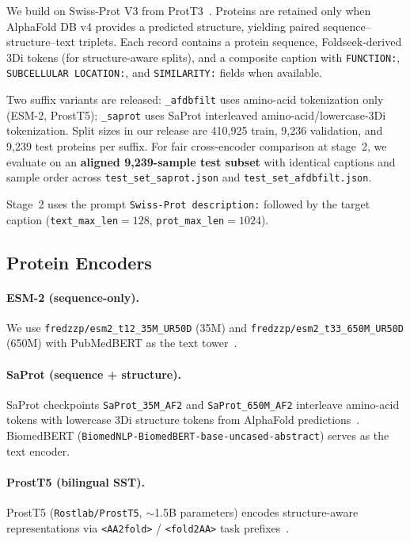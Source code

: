 \documentclass[conference]{IEEEtran}
\begin{document}
We build on Swiss-Prot V3 from ProtT3~\cite{liu2024prott3}.
Proteins are retained only when AlphaFold DB v4 provides a predicted structure, yielding paired sequence--structure--text triplets.
Each record contains a protein sequence, Foldseek-derived 3Di tokens (for structure-aware splits), and a composite caption with \texttt{FUNCTION:}, \texttt{SUBCELLULAR LOCATION:}, and \texttt{SIMILARITY:} fields when available.

Two suffix variants are released:
\texttt{\_afdbfilt} uses amino-acid tokenization only (ESM-2, ProstT5);
\texttt{\_saprot} uses SaProt interleaved amino-acid/lowercase-3Di tokenization.
Split sizes in our release are 410{,}925 train, 9{,}236 validation, and 9{,}239 test proteins per suffix.
For fair cross-encoder comparison at stage~2, we evaluate on an \textbf{aligned 9{,}239-sample test subset} with identical captions and sample order across \texttt{test\_set\_saprot.json} and \texttt{test\_set\_afdbfilt.json}.

Stage~2 uses the prompt \texttt{Swiss-Prot description:} followed by the target caption (\texttt{text\_max\_len}${=}128$, \texttt{prot\_max\_len}${=}1024$).

\subsection{Protein Encoders}

\paragraph{ESM-2 (sequence-only).}
We use \texttt{fredzzp/esm2\_t12\_35M\_UR50D} (35M) and \texttt{fredzzp/esm2\_t33\_650M\_UR50D} (650M) with PubMedBERT as the text tower~\cite{liu2024prott3}.

\paragraph{SaProt (sequence + structure).}
SaProt checkpoints \texttt{SaProt\_35M\_AF2} and \texttt{SaProt\_650M\_AF2} interleave amino-acid tokens with lowercase 3Di structure tokens from AlphaFold predictions~\cite{su2023saprot}.
BiomedBERT (\texttt{BiomedNLP-BiomedBERT-base-uncased-abstract}) serves as the text encoder.

\paragraph{ProstT5 (bilingual SST).}
ProstT5 (\texttt{Rostlab/ProstT5}, $\sim$1.5B parameters) encodes structure-aware representations via \texttt{<AA2fold>} / \texttt{<fold2AA>} task prefixes~\cite{heinzinger2024prostt5}.
\end{document}

